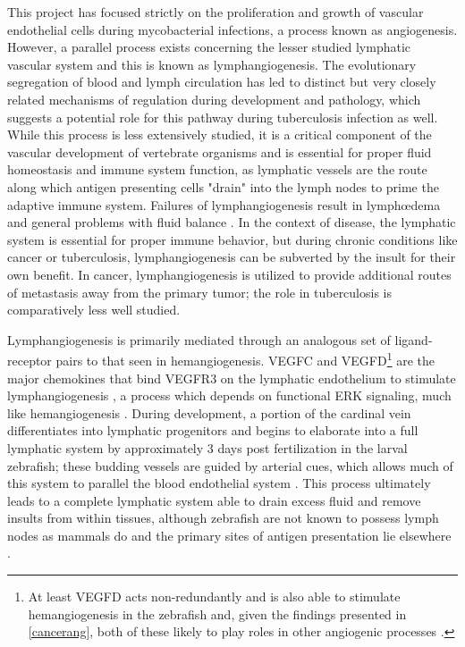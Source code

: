 This project has focused strictly on the proliferation and growth of vascular endothelial cells during mycobacterial infections, a process known as angiogenesis. However, a parallel process exists concerning the lesser studied lymphatic vascular system and this is known as lymphangiogenesis. The evolutionary segregation of blood and lymph circulation has led to distinct but very closely related mechanisms of regulation during development and pathology, which suggests a potential role for this pathway during tuberculosis infection as well. While this process is less extensively studied, it is a critical component of the vascular development of vertebrate organisms and is essential for proper fluid homeostasis and immune system function, as lymphatic vessels are the route along which antigen presenting cells "drain" into the lymph nodes to prime the adaptive immune system. Failures of lymphangiogenesis result in lymph\oe dema and general problems with fluid balance \citep{Makinen2001}. In the context of disease, the lymphatic system is essential for proper immune behavior, but during chronic conditions like cancer or tuberculosis, lymphangiogenesis can be subverted by the insult for their own benefit. In cancer, lymphangiogenesis is utilized to provide additional routes of metastasis away from the primary tumor; the role in tuberculosis is comparatively less well studied.

Lymphangiogenesis is primarily mediated through an analogous set of ligand-receptor pairs to that seen in hemangiogenesis. VEGFC and VEGFD\footnote{At least VEGFD acts non-redundantly and is also able to stimulate hemangiogenesis in the zebrafish and, given the findings presented in \autoref{cancerang}, both of these likely to play roles in other angiogenic processes \citep{Bower2017a}.} are the major  chemokines that bind VEGFR3 on the lymphatic endothelium to stimulate lymphangiogenesis \citep{Alitalo2005, Kuchler2006, Haiko2008}, a process which depends on functional ERK signaling, much like hemangiogenesis \citep{Shin2017, Shin2016}. During development, a portion of the cardinal vein differentiates into lymphatic progenitors \citep{Yaniv2006, Nicenboim2015} and begins to elaborate into a full lymphatic system by approximately 3 days post fertilization in the larval zebrafish; these budding vessels are guided by arterial cues, which allows much of this system to parallel the blood endothelial system \citep{Jung2017, Bussmann2010}. This process ultimately leads to a complete lymphatic system able to drain excess fluid and remove insults from within tissues, although zebrafish are not known to possess lymph nodes as mammals do and the primary sites of antigen presentation lie elsewhere \citep{vanLessen2017, Onder2017}.

